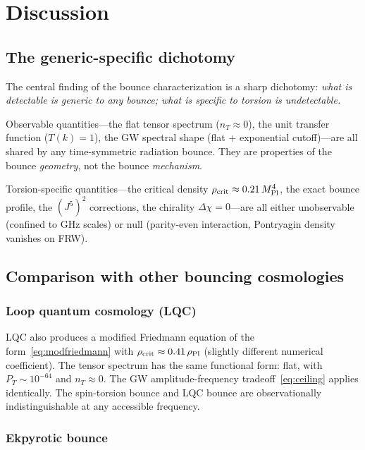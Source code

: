 \documentclass[aps,prd,twocolumn,superscriptaddress,showpacs,preprintnumbers,
  nofootinbib,longbibliography,floatfix]{revtex4-2}
\newcommand{\rhocrit}{\rho_{\rm crit}}
\newcommand{\rhoPl}{\rho_{\rm Pl}}
\newcommand{\MPl}{M_{\rm Pl}}
\begin{document}
\section{Discussion}\label{sec:discussion}

\subsection{The generic-specific dichotomy}

The central finding of the bounce characterization is a sharp dichotomy:
\textit{what is detectable is generic to any bounce; what is specific to
torsion is undetectable.}

Observable quantities---the flat tensor spectrum ($n_T \approx 0$), the
unit transfer function ($T(k) = 1$), the GW spectral shape (flat +
exponential cutoff)---are all shared by any time-symmetric radiation
bounce. They are properties of the bounce \textit{geometry}, not the
bounce \textit{mechanism}.

Torsion-specific quantities---the critical density $\rhocrit \approx
0.21\,\MPl^4$, the exact bounce profile, the $(J^5)^2$ corrections, the
chirality $\Delta\chi = 0$---are all either unobservable (confined to
GHz scales) or null (parity-even interaction, Pontryagin density vanishes
on FRW).

\subsection{Comparison with other bouncing cosmologies}

\subsubsection{Loop quantum cosmology (LQC)}

LQC also produces a modified Friedmann equation of the
form~\eqref{eq:modfriedmann} with $\rhocrit \approx 0.41\,\rhoPl$
(slightly different numerical coefficient). The tensor spectrum has the
same functional form: flat, with $P_T \sim 10^{-64}$ and $n_T \approx
0$. The GW amplitude-frequency tradeoff~\eqref{eq:ceiling} applies
identically. The spin-torsion bounce and LQC bounce are observationally
indistinguishable at any accessible frequency.

\subsubsection{Ekpyrotic bounce}
\end{document}
